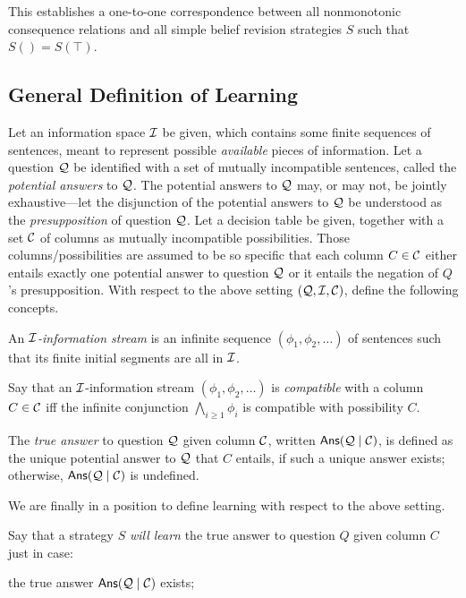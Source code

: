 This establishes a one-to-one correspondence between all nonmonotonic consequence relations and all simple belief revision strategies $S$ such that $S() = S(\top)$.

\subsection{General Definition of Learning}\label{app-learning}

Let an information space $\cal I$ be given, which contains some finite sequences of sentences, meant to represent possible {\em available} pieces of information. Let a question $\cal Q$ be identified with a set of mutually incompatible sentences, called the {\em potential answers} to $\cal Q$. The potential answers to $\cal Q$ may, or may not, be jointly exhaustive---let the disjunction of the potential answers to $\cal Q$ be understood as the {\em presupposition} of question $\cal Q$. Let a decision table be given, together with a set ${\cal C}$ of columns as mutually incompatible possibilities. Those columns/possibilities are assumed to be so specific that each column $C \in {\cal C}$ either entails exactly one potential answer to question $\cal Q$ or it entails the negation of $Q$'s presupposition. With respect to the above setting $({\cal Q}, {\cal I}, {\cal C})$, define the following concepts. \op

	\im An {\em $\cal I$-information stream} is an infinite sequence $(\phi_1, \phi_2, \ldots)$ of sentences such that its finite initial segments are all in $\cal I$.
	
	\im Say that an $\cal I$-information stream $(\phi_1, \phi_2, \ldots)$ is {\em compatible} with a column $C \in {\cal C}$ iff the infinite conjunction $\bigwedge_{i \ge 1} \phi_i$ is compatible with possibility $C$.
	
	\im The {\em true answer} to question $\cal Q$ given column $\cal C$, written $\mathsf{Ans}({\cal Q} \mid {\cal C})$, is defined as the unique potential answer to $\cal Q$ that $C$ entails, if such a unique answer exists; otherwise, $\mathsf{Ans}({\cal Q} \mid {\cal C})$ is undefined. 
	
\ed We are finally in a position to define learning with respect to the above setting. \op

	\im Say that a strategy $S$ {\em will learn} the true answer to question $Q$ given column $C$ just in case: \op
	
		\im[(1)] the true answer $\mathsf{Ans}({\cal Q} \mid {\cal C})$ exists;
		
